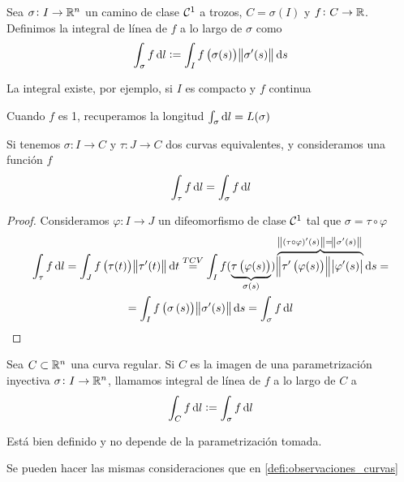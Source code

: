 \begin{defi}
    Sea $\sigma \colon I \to \mathbb{R}^n$ un camino de clase $\mathcal{C}^1$ a trozos, $C = \sigma(I)$ y $f \colon C \to \mathbb{R}$. Definimos
    la integral de línea de $f$ a lo largo de $\sigma$ como
    \[
        \int_\sigma f \dif l := \int_I f\left( \sigma(s) \right) \norm{\sigma^\prime(s)} \dif s
    \]

    La integral existe, por ejemplo, si $I$ es compacto y $f$ continua
\end{defi}

\begin{obs*}
    Cuando $f$ es 1, recuperamos la longitud $\int_\sigma \dif l = L(\sigma)$
\end{obs*}

\begin{prop}
    Si tenemos $\sigma \colon I \to C$ y $\tau \colon J \to C$ dos curvas equivalentes, y consideramos una función $f$
    \[
        \int_\tau f \dif l = \int_\sigma f \dif l
    \]
\end{prop}

\begin{proof}
    Consideramos $\varphi \colon I \to J$ un difeomorfismo de clase $\mathcal{C}^1$ tal que $\sigma = \tau \circ \varphi$
    \begin{gather*}
        \int_\tau f \dif l = \int_J f\left( \tau(t) \right) \norm{\tau^\prime(t)} \dif t \stackrel{TCV}{=}
        \int_I f( \underbrace{\tau\left( \varphi(s) \right)}_{\sigma(s)} ) \overbrace{\norm{\tau^\prime\left( \varphi(s) \right)}
        \abs{\varphi^\prime(s)}}^{\norm{(\tau \circ \varphi)^\prime (s)} = \norm{\sigma^\prime (s)}} \dif s= \\
        = \int_I f\left( \sigma\left( s \right) \right) \norm{\sigma^\prime(s)} \dif s = \int_\sigma f \dif l
    \end{gather*}
\end{proof}

\begin{defi}
    Sea $C \subset \mathbb{R}^n$ una curva regular. Si $C$ es la imagen de una parametrización inyectiva $\sigma \colon I \to \mathbb{R}^n$,
    llamamos integral de línea de $f$ a lo largo de $C$ a
    \[
        \int_C f \dif l := \int_\sigma f \dif l
    \]
\end{defi}

\begin{obs*}
    Está bien definido y no depende de la parametrización tomada.
\end{obs*}
\begin{obs*}
    Se pueden hacer las mismas consideraciones que en \ref{defi:observaciones_curvas} 
\end{obs*}

